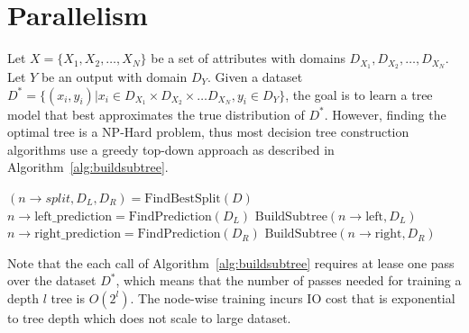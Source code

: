 
\section{Parallelism} %
\label{sec:parallelism}

Let $X = \{X_1, X_2, \dots, X_N\}$ be a set of attributes with domains
$D_{X_1}, D_{X_2}, \dots, D_{X_N}$. Let $Y$ be an output with domain $D_Y$.
Given a dataset $D^* = \{(x_i, y_i) | x_i \in D_{X_1} \times D_{X_2} \times \dots D_{X_N}, y_i \in D_Y\}$,
the goal is to learn a tree model that best approximates the true
distribution of $D^*$. However, finding the optimal tree is a NP-Hard problem,
thus most decision tree construction algorithms use a greedy top-down approach
as described in Algorithm~\ref{alg:buildsubtree}.

\begin{algorithm}[BuildSubtree$(n, D)$] \label{alg:buildsubtree}
\begin{algorithmic}[1]
    \State $\left(n \rightarrow split, D_L, D_R \right) = \text{FindBestSplit}(D)$
        \State $n \rightarrow \text{left\_prediction} = \text{FindPrediction}(D_L)$
    \Else
        \State $\text{BuildSubtree}(n \rightarrow \text{left}, D_L)$
    \EndIf
        \State $n \rightarrow \text{right\_prediction} = \text{FindPrediction}(D_R)$
    \Else
        \State $\text{BuildSubtree}(n \rightarrow \text{right}, D_R)$
    \EndIf
\end{algorithmic}
\end{algorithm}


Note that the each call of Algorithm~\ref{alg:buildsubtree} requires at lease
one pass over the dataset $D^*$, which means that the number of passes needed
for training a depth $l$ tree is $O(2^l)$. The node-wise training incurs IO
cost that is exponential to tree depth which does not scale to large dataset.

